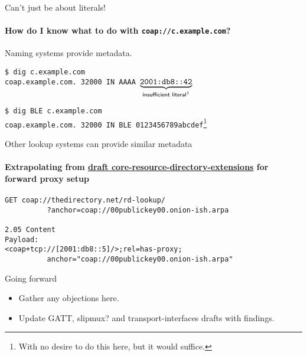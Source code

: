 \documentclass[aspectratio=169,colorlinks]{beamer}
\newcommand{\ietfdraft}[1]{\href{https://datatracker.ietf.org/doc/draft-#1/}{draft #1}}
\begin{document}
\begin{frame}{Can't just be about literals!}\large
  \framesubtitle{How do I know what to do with \texttt{coap://c.example.com}?}

  Naming systems provide metadata.

  \bigskip

  \texttt{{\color{gray}\$} dig c.example.com}\\
  \texttt{coap.example.com. 32000 IN AAAA $\underbrace{\texttt{2001:db8::42}}_{\textsf{insufficient literal\footnotemark[1]}}$}

  \texttt{{\color{gray}\$} dig BLE c.example.com}\\
  \texttt{coap.example.com. 32000 IN BLE 0123456789abcdef}\footnote[2]{With no desire to do this here, but it would suffice.}
\end{frame}

\begin{frame}[fragile]{Other lookup systems can provide similar metadata}\large
  \framesubtitle{Extrapolating from \ietfdraft{core-resource-directory-extensions} for forward proxy setup}

\begin{verbatim}
GET coap://thedirectory.net/rd-lookup/
          ?anchor=coap://00publickey00.onion-ish.arpa

2.05 Content
Payload:
<coap+tcp://[2001:db8::5]/>;rel=has-proxy;
          anchor="coap://00publickey00.onion-ish.arpa"
\end{verbatim}
\end{frame}

\begin{frame}{Going forward}\Large
  \begin{itemize}
    \item Gather any objections here.
    \item Update GATT, slipmux? and transport-interfaces drafts with findings.
  \end{itemize}
\end{frame}
\end{document}
